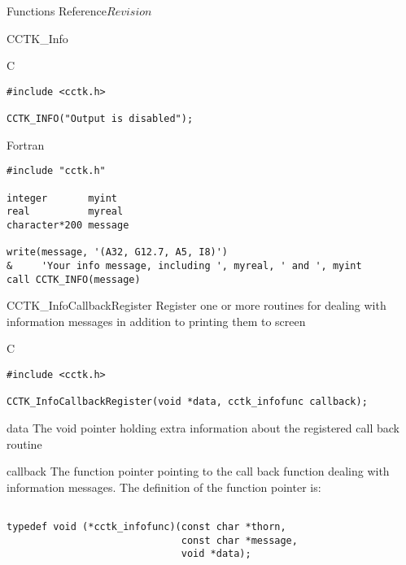 \begin{cactuspart}{ Functions Reference}{}{$Revision$}
\begin{FunctionDescription}{CCTK\_Info}
\begin{ExampleSection}
\begin{Example}{C}
\begin{verbatim}
#include <cctk.h>

CCTK_INFO("Output is disabled");
\end{verbatim}
\end{Example}
\begin{Example}{Fortran}
\begin{verbatim}
#include "cctk.h"

integer       myint
real          myreal
character*200 message

write(message, '(A32, G12.7, A5, I8)')
&     'Your info message, including ', myreal, ' and ', myint
call CCTK_INFO(message)
\end{verbatim}
\end{Example}
\end{ExampleSection}
\end{FunctionDescription}

\begin{FunctionDescription}{CCTK\_InfoCallbackRegister}
\label{CCTK-INFOCallbackRegister}
Register one or more routines for dealing with information messages in
addition to printing them to screen
\begin{SynopsisSection}
\begin{Synopsis}{C}
\begin{verbatim}
#include <cctk.h>

CCTK_InfoCallbackRegister(void *data, cctk_infofunc callback);

\end{verbatim}
\end{Synopsis}
\end{SynopsisSection}

\begin{ParameterSection}
\begin{Parameter}{data}
The void pointer holding extra information about the registered call back
routine
\end{Parameter}

\begin{Parameter}{callback}
The function pointer pointing to the call back function dealing with
information messages. The definition of the function pointer is:
\begin{verbatim}

typedef void (*cctk_infofunc)(const char *thorn,
                              const char *message,
                              void *data);


\end{verbatim}
\end{Parameter}
\end{ParameterSection}
\end{FunctionDescription}
\end{cactuspart}
